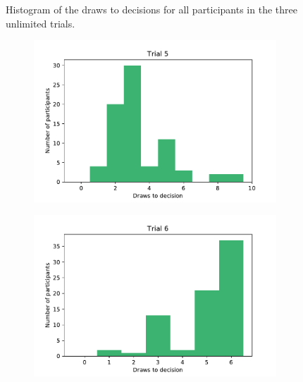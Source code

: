 \begin{figure}
\begin{subfigure}{0.48\textwidth}
    \end{subfigure}
    \caption[Draws to decision in the unlimited trials]{Histogram of the draws to decisions for all participants in the three unlimited trials.}
    \label{fig:dtd_unlimited_trials}
\end{figure}


\begin{figure}
    \centering
    \begin{subfigure}{0.48\textwidth}
        \includegraphics[scale=0.36]{pictures/dtd5_histogram.pdf}
    \end{subfigure}
    \hfill
    \begin{subfigure}{0.48\textwidth}
        \includegraphics[scale=0.36]{pictures/dtd6_histogram.pdf}
    \end{subfigure}
    \vfill
    \begin{subfigure}{0.48\textwidth}

\end{subfigure}
\end{figure}
